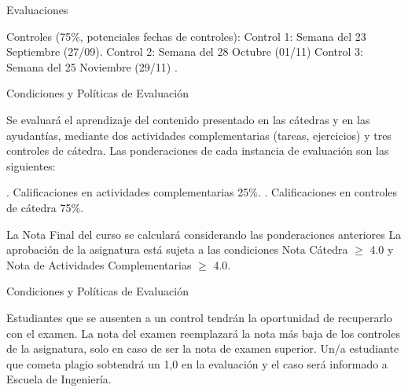 \documentclass{beamer}
\begin{document}
  \begin{frame}{Evaluaciones}
  \begin{outline}
  	
  	\1 Controles (75\%, potenciales fechas de controles):
	\2 Control 1:  Semana del 23 Septiembre (27/09).
	\2 Control 2:  Semana del 28 Octubre (01/11)
	\2 Control 3:  Semana del 25 Noviembre (29/11) .

	
  \end{outline}
  \end{frame}
  
  \begin{frame}{Condiciones y Políticas de Evaluación}
  \small
  \begin{outline}
   \1 Se evaluará el aprendizaje del contenido presentado en las cátedras y en las ayudantías, mediante dos actividades complementarias (tareas, ejercicios) y tres controles de cátedra. Las ponderaciones de cada instancia de evaluación son las siguientes:
   \begin{itemize}
   . Calificaciones en actividades complementarias 25\%.
  . Calificaciones en controles de cátedra 75\%.
  \end{itemize}
   \1 La Nota Final del curso se calculará considerando las ponderaciones anteriores
    \1 La aprobación de la asignatura está sujeta a las condiciones Nota Cátedra $≥$ 4.0 y Nota de Actividades Complementarias $≥$ 4.0.
  \end{outline}
  \end{frame}
  
  \begin{frame}{Condiciones y Políticas de Evaluación}
  \small
  \begin{outline}      
   \1 Estudiantes que se ausenten a un control tendrán la oportunidad de recuperarlo con el examen. La nota del examen reemplazará la nota más baja de los controles de la asignatura, solo en caso de ser la nota de examen superior.
     \1 Un/a estudiante que cometa plagio sobtendrá un 1,0 en la evaluación y el caso será informado a Escuela de Ingeniería.
  \end{outline}
  \end{frame}
\end{document}
